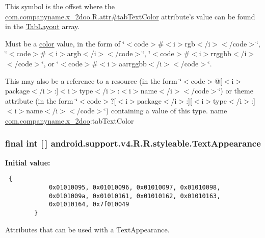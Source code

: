 This symbol is the offset where the \hyperlink{classcom_1_1companyname_1_1x__2doo_1_1_r_1_1attr_19a3682daf015e5ae97ede6684865c2b}{com.companyname.x\_\-2doo.R.attr\#tabTextColor} attribute's value can be found in the \hyperlink{classandroid_1_1support_1_1v4_1_1_r_1_1styleable_d1f1104cdc4fac0ab4797d48f7efe351}{TabLayout} array.

Must be a \hyperlink{classandroid_1_1support_1_1v4_1_1_r_1_1color}{color} value, in the form of \char`\"{}$<$code$>$\#$<$i$>$rgb$<$/i$>$$<$/code$>$\char`\"{}, \char`\"{}$<$code$>$\#$<$i$>$argb$<$/i$>$$<$/code$>$\char`\"{}, \char`\"{}$<$code$>$\#$<$i$>$rrggbb$<$/i$>$$<$/code$>$\char`\"{}, or \char`\"{}$<$code$>$\#$<$i$>$aarrggbb$<$/i$>$$<$/code$>$\char`\"{}. 

This may also be a reference to a resource (in the form \char`\"{}$<$code$>$@\mbox{[}$<$i$>$package$<$/i$>$:\mbox{]}$<$i$>$type$<$/i$>$:$<$i$>$name$<$/i$>$$<$/code$>$\char`\"{}) or theme attribute (in the form \char`\"{}$<$code$>$?\mbox{[}$<$i$>$package$<$/i$>$:\mbox{]}\mbox{[}$<$i$>$type$<$/i$>$:\mbox{]}$<$i$>$name$<$/i$>$$<$/code$>$\char`\"{}) containing a value of this type.  name \hyperlink{namespacecom_1_1companyname_1_1x__2doo}{com.companyname.x\_\-2doo}:tabTextColor \hypertarget{classandroid_1_1support_1_1v4_1_1_r_1_1styleable_958f0ff7225bca693e30641e14dd4569}{
\subsubsection[{TextAppearance}]{\setlength{\rightskip}{0pt plus 5cm}final int \mbox{[}$\,$\mbox{]} android.support.v4.R.R.styleable.TextAppearance}}
\label{classandroid_1_1support_1_1v4_1_1_r_1_1styleable_958f0ff7225bca693e30641e14dd4569}


\textbf{Initial value:}

\begin{Code}\begin{verbatim} {
            0x01010095, 0x01010096, 0x01010097, 0x01010098,
            0x0101009a, 0x01010161, 0x01010162, 0x01010163,
            0x01010164, 0x7f010049
        }
\end{verbatim}
\end{Code}
Attributes that can be used with a TextAppearance. 

